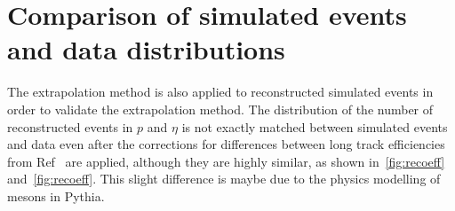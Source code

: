 
\section{Comparison of simulated events and data distributions}
\label{sec:simcal}
The extrapolation method is also applied to reconstructed simulated events in order to validate the extrapolation method. The distribution of the number of reconstructed events in $p$ and $\eta$ is not exactly matched between simulated events and data even after the corrections for differences between long track efficiencies from Ref~\cite{LHCB-DP-2013-002} are applied, although they are highly similar, as shown in~\autoref{fig:recoeff}\protect{} and~\autoref{fig:recoeff}\protect{}.  This slight difference is maybe due to the physics modelling of \KS mesons in Pythia. %

